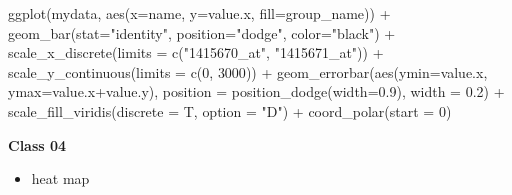 \documentclass[
]{book}
\newenvironment{Shaded}{\begin{snugshade}}{\end{snugshade}}
\newcommand{\AttributeTok}[1]{\textcolor[rgb]{0.77,0.63,0.00}{#1}}
\newcommand{\DecValTok}[1]{\textcolor[rgb]{0.00,0.00,0.81}{#1}}
\newcommand{\FloatTok}[1]{\textcolor[rgb]{0.00,0.00,0.81}{#1}}
\newcommand{\FunctionTok}[1]{\textcolor[rgb]{0.00,0.00,0.00}{#1}}
\newcommand{\NormalTok}[1]{#1}
\newcommand{\SpecialCharTok}[1]{\textcolor[rgb]{0.00,0.00,0.00}{#1}}
\newcommand{\StringTok}[1]{\textcolor[rgb]{0.31,0.60,0.02}{#1}}
\providecommand{\tightlist}{%
  \setlength{\itemsep}{0pt}\setlength{\parskip}{0pt}}
\begin{document}
\begin{Shaded}
\begin{Highlighting}[]

\FunctionTok{ggplot}\NormalTok{(mydata, }\FunctionTok{aes}\NormalTok{(}\AttributeTok{x=}\NormalTok{name, }\AttributeTok{y=}\NormalTok{value.x, }\AttributeTok{fill=}\NormalTok{group\_name)) }\SpecialCharTok{+}
  \FunctionTok{geom\_bar}\NormalTok{(}\AttributeTok{stat=}\StringTok{"identity"}\NormalTok{, }\AttributeTok{position=}\StringTok{"dodge"}\NormalTok{, }\AttributeTok{color=}\StringTok{"black"}\NormalTok{) }\SpecialCharTok{+}
  \FunctionTok{scale\_x\_discrete}\NormalTok{(}\AttributeTok{limits =} \FunctionTok{c}\NormalTok{(}\StringTok{"1415670\_at"}\NormalTok{, }\StringTok{"1415671\_at"}\NormalTok{)) }\SpecialCharTok{+}
  \FunctionTok{scale\_y\_continuous}\NormalTok{(}\AttributeTok{limits =} \FunctionTok{c}\NormalTok{(}\DecValTok{0}\NormalTok{, }\DecValTok{3000}\NormalTok{)) }\SpecialCharTok{+}
  \FunctionTok{geom\_errorbar}\NormalTok{(}\FunctionTok{aes}\NormalTok{(}\AttributeTok{ymin=}\NormalTok{value.x, }\AttributeTok{ymax=}\NormalTok{value.x}\SpecialCharTok{+}\NormalTok{value.y),}
                \AttributeTok{position =} \FunctionTok{position\_dodge}\NormalTok{(}\AttributeTok{width=}\FloatTok{0.9}\NormalTok{), }
                \AttributeTok{width =} \FloatTok{0.2}\NormalTok{) }\SpecialCharTok{+}
  \FunctionTok{scale\_fill\_viridis}\NormalTok{(}\AttributeTok{discrete =}\NormalTok{ T, }\AttributeTok{option =} \StringTok{"D"}\NormalTok{) }\SpecialCharTok{+}
  \FunctionTok{coord\_polar}\NormalTok{(}\AttributeTok{start =} \DecValTok{0}\NormalTok{)  }
\end{Highlighting}
\end{Shaded}

\textbf{Class 04}

\begin{itemize}
\tightlist
\item
  heat map
\end{itemize}
\end{document}
